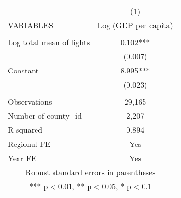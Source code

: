 \documentclass[]{article}
\begin{document}
\begin{tabular}{lc} \hline
 & (1) \\
VARIABLES & Log (GDP per capita) \\ \hline
 &  \\
Log total mean of lights & 0.102*** \\
 & (0.007) \\
Constant & 8.995*** \\
 & (0.023) \\
 &  \\
Observations & 29,165 \\
Number of county\_id & 2,207 \\
R-squared & 0.894 \\
Regional FE & Yes \\
 Year FE & Yes \\ \hline
\multicolumn{2}{c}{ Robust standard errors in parentheses} \\
\multicolumn{2}{c}{ *** p$<$0.01, ** p$<$0.05, * p$<$0.1} \\
\end{tabular}
\end{document}
